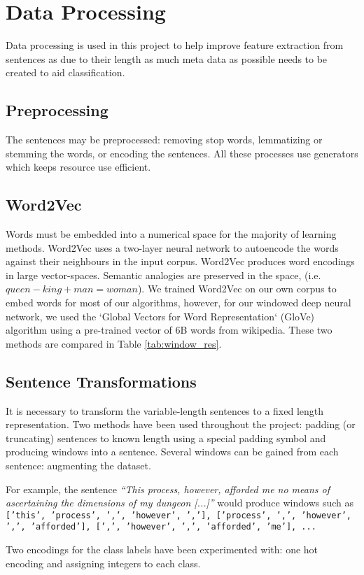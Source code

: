 \section{Data Processing}
\label{sec:data_processing}

Data processing is used in this project to help improve feature extraction from sentences as due to their length as much meta data as possible needs to be created to aid classification.

  \subsection{Preprocessing}
  \label{sec:preprocessing}
    The sentences may be preprocessed: removing stop words, lemmatizing or
    stemming the words, or encoding the sentences. All these processes use
    generators which keeps resource use efficient.

  \subsection{Word2Vec}
  \label{sec:word2vec}
  Words must be embedded into a numerical space for the majority of learning methods. Word2Vec uses a two-layer neural network to autoencode the words against their neighbours in the input corpus. Word2Vec produces word encodings in large vector-spaces. Semantic analogies are preserved in the space, (i.e. $queen - king + man = woman$). We trained Word2Vec on our own corpus to embed words for most of our algorithms, however, for our windowed deep neural network, we used the `Global Vectors for Word Representation` (GloVe) algorithm using a pre-trained vector of 6B words from wikipedia. These two methods are compared in Table \ref{tab:window_res}.

  \subsection{Sentence Transformations}
  \label{sec:sentence_transformations}

    It is necessary to transform the variable-length sentences to a fixed length
    representation. Two methods have been used throughout the project: padding
    (or truncating) sentences to known length using a special padding symbol and
    producing windows into a sentence. Several windows can be gained from each
    sentence: augmenting the dataset.

    For example, the sentence \textit{``This process, however, afforded me no
      means of ascertaining the dimensions of my dungeon [...]''} would produce windows
    such as \texttt{['this', 'process', ',', 'however', ','], ['process', ',',
      'however', ',', 'afforded'], [',', 'however', ',', 'afforded', 'me'], ...}

    Two encodings for the class labels have been experimented with: one hot
    encoding and assigning integers to each class.
